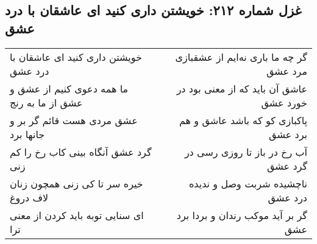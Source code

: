 \begin{center}
\section*{غزل شماره ۲۱۲: خویشتن داری کنید ای عاشقان با درد عشق}
\label{sec:212}
\begin{longtable}{l p{0.5cm} r}
خویشتن داری کنید ای عاشقان با درد عشق
&&
گر چه ما باری نه‌ایم از عشقبازی مرد عشق
\\
ما همه دعوی کنیم از عشق و عشق از ما به رنج
&&
عاشق آن باید که از معنی بود در خورد عشق
\\
عشق مردی هست قائم گر بر و جانها برد
&&
پاکبازی کو که باشد عاشق و هم برد عشق
\\
گرد عشق آنگاه بینی کاب رخ را کم زنی
&&
آب رخ در باز تا روزی رسی در گرد عشق
\\
خیره سر تا کی زنی همچون زنان لاف دروغ
&&
ناچشیده شربت وصل و ندیده درد عشق
\\
ای سنایی توبه باید کردن از معنی ترا
&&
گر بر آید موکب رندان و بردا برد عشق
\\
\end{longtable}
\end{center}
